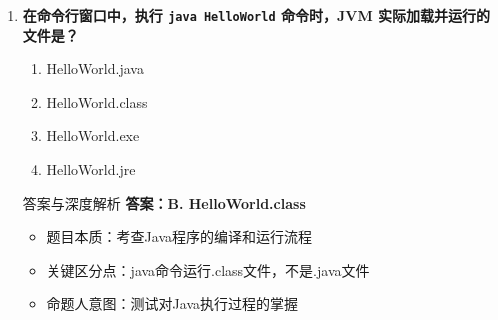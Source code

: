 \documentclass[12pt, a4paper]{ctexart}
\begin{document}
\begin{enumerate}[label=\textbf{\arabic*.}]
\begin{bluebox}{答案与深度解析}
		      \begin{itemize}[leftmargin=*, nosep]
			      \item 近年真题规律：
			            \begin{itemize}
				            \item 95\%考题选择A选项
				            \item 常见干扰项：B选项（颠倒关系）
				            \item 此题属于送分题，必须掌握
			            \end{itemize}

			      \item 考场秒杀：
			            \begin{enumerate}
				            \item 记住包含顺序：JDK ⊃ JRE ⊃ JVM
				            \item 记住关键字：JDK（开发）、JRE（运行）、JVM（执行）
			            \end{enumerate}

			      \item 记忆口诀：
			            \begin{itemize}
				            \item {JDK = 开发者装}
				            \item {JRE = 运行者装}
				            \item {JVM = 虚拟机}
			            \end{itemize}
		      \end{itemize}
	      \end{bluebox}

	      \newpage

	\item \textbf{在命令行窗口中，执行 \texttt{java HelloWorld} 命令时，JVM 实际加载并运行的文件是？}
	      \begin{enumerate}[label=\Alph*.]
		      \item HelloWorld.java
		      \item HelloWorld.class
		      \item HelloWorld.exe
		      \item HelloWorld.jre
	      \end{enumerate}

	      \begin{bluebox}{答案与深度解析}
		      \textbf{答案：B. HelloWorld.class}

		      \begin{itemize}[leftmargin=*, nosep]
			      \item 题目本质：考查Java程序的编译和运行流程
			      \item 关键区分点：java命令运行.class文件，不是.java文件
			      \item 命题人意图：测试对Java执行过程的掌握
		      \end{itemize}


\end{bluebox}
\end{enumerate}
\end{document}
